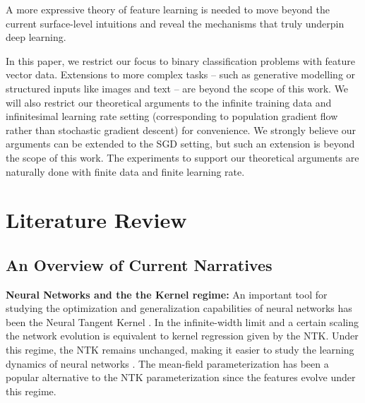 \documentclass{article}
\theoremstyle{plain}
\theoremstyle{definition}
\theoremstyle{remark}
\newcommand{\1}{{\mathbf 1}}
\newcommand{\0}{{\mathbf 0}}
\renewcommand{\>}{{\rightarrow}}
\begin{document}
A more expressive theory of feature learning is needed to move beyond the current surface-level intuitions and reveal the mechanisms that truly underpin deep learning.

In this paper, we restrict our focus to binary classification problems with feature vector data. Extensions to more complex tasks -- such as generative modelling or structured inputs like images and text -- are beyond the scope of this work. We will also restrict our theoretical arguments to the infinite training data and infinitesimal learning rate setting (corresponding to population gradient flow rather than stochastic gradient descent) for convenience. We strongly believe our arguments can be extended to the SGD setting, but such an extension is beyond the scope of this work. The experiments to support our theoretical arguments are naturally done with finite data and finite learning rate.

\section{Literature Review}

\subsection{An Overview of Current Narratives}

\textbf{Neural Networks and the the Kernel regime:} An important tool for studying the optimization and generalization capabilities of neural networks has been the Neural Tangent Kernel \cite{Jacot+18, Lee+19}. In the infinite-width limit and a certain scaling the network evolution is equivalent to kernel regression given by the NTK. Under this regime, the NTK remains unchanged, making it easier to study the learning dynamics of neural networks \cite{Du+18, Du+19, Arora+18}. The mean-field parameterization \cite{Mei+18, Chizat+18, Bordelon+25} has been a popular alternative to the NTK parameterization since the features evolve under this regime.
\end{document}
